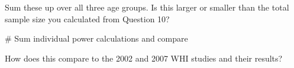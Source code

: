 \documentclass[
  letterpaper,
  DIV=11,
  numbers=noendperiod]{scrartcl}
\newenvironment{Shaded}{\begin{snugshade}}{\end{snugshade}}
\newcommand{\CommentTok}[1]{\textcolor[rgb]{0.37,0.37,0.37}{#1}}
\begin{document}
Sum these up over all three age groups. Is this larger or smaller than
the total sample size you calculated from Question 10?

\begin{Shaded}
\begin{Highlighting}[]
\CommentTok{\# Sum individual power calculations and compare}
\end{Highlighting}
\end{Shaded}

How does this compare to the 2002 and 2007 WHI studies and their
results?

\hfill\break
\hfill\break
\hfill\break
\hfill\break
\hfill\break
\end{document}
